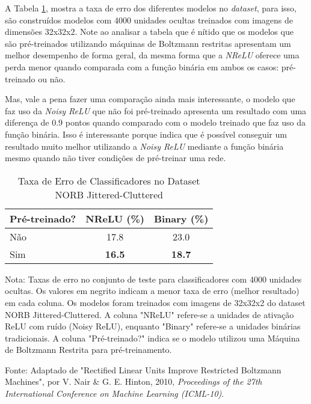 A Tabela \ref{tab:norb-error-rate}, mostra a taxa de erro dos diferentes modelos no \textit{dataset}, para isso, são construídos modelos com 4000 unidades ocultas treinados com imagens de dimensões 32x32x2. Note ao analisar a tabela que é nítido que os modelos que são pré-treinados utilizando máquinas de Boltzmann restritas apresentam um melhor desempenho de forma geral, da mesma forma que a \textit{NReLU} oferece uma perda menor quando comparada com a função binária em ambos os casos: pré-treinado ou não. 

Mas, vale a pena fazer uma comparação ainda mais interessante, o modelo que faz uso da \textit{Noisy ReLU} que não foi pré-treinado apresenta um resultado com uma diferença de 0.9 pontos quando comparado com o modelo treinado que faz uso da função binária. Isso é interessante porque indica que é possível conseguir um resultado muito melhor utilizando a \textit{Noisy ReLU} mediante a função binária mesmo quando não tiver condições de pré-treinar uma rede.

\begin{table}[ht]
    \centering
    \begin{threeparttable}
        \caption{Taxa de Erro de Classificadores no Dataset NORB Jittered-Cluttered}
        \label{tab:norb-error-rate}
        \begin{tabular}{lcc}
            \toprule
            \textbf{Pré-treinado?} & \textbf{NReLU (\%)} & \textbf{Binary (\%)} \\
            \midrule
            
            Não & 17.8 & 23.0 \\
            Sim & \textbf{16.5} & \textbf{18.7} \\
            
            \bottomrule
        \end{tabular}
        
        \begin{tablenotes}[para]
            \small
            \item[] Nota: Taxas de erro no conjunto de teste para classificadores com 4000 unidades ocultas. Os valores em negrito indicam a menor taxa de erro (melhor resultado) em cada coluna. Os modelos foram treinados com imagens de 32x32x2 do dataset NORB Jittered-Cluttered. A coluna "NReLU" refere-se a unidades de ativação ReLU com ruído (Noisy ReLU), enquanto "Binary" refere-se a unidades binárias tradicionais. A coluna "Pré-treinado?" indica se o modelo utilizou uma Máquina de Boltzmann Restrita para pré-treinamento.
            \item[] Fonte: Adaptado de "Rectified Linear Units Improve Restricted Boltzmann Machines", por V. Nair \& G. E. Hinton, 2010, \textit{Proceedings of the 27th International Conference on Machine Learning (ICML-10)}.
        \end{tablenotes}
        
    \end{threeparttable}
\end{table}

